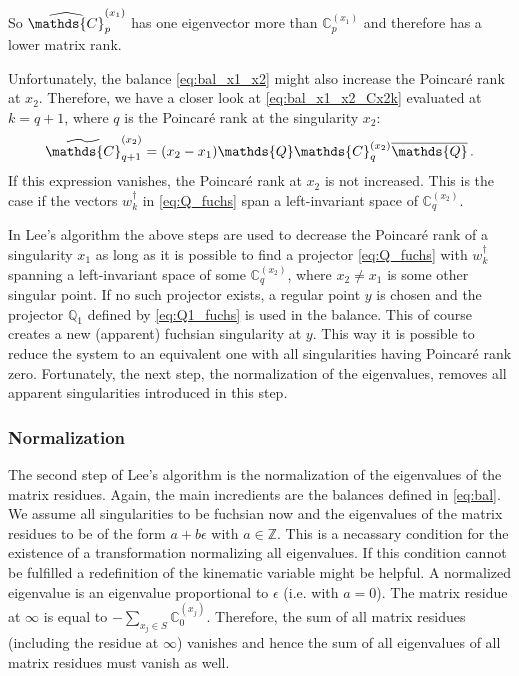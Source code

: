 \documentclass[12pt]{article}
\numberwithin{equation}{section}
\numberwithin{figure}{section}
\newcommand{\C}{\mathds{C}}
\newcommand{\Q}{\mathds{Q}}
\newcommand{\Qbar}{\overline\Q}
\begin{document}
        So $\widehat \C^{(x_1)}_p$ has one eigenvector more than $\C^{(x_1)}_p$ and therefore has a lower matrix rank.
        
        Unfortunately, the balance \eqref{eq:bal_x1_x2} might also increase the Poincar\'{e} rank at $x_2$.
				Therefore, we have a closer look at \eqref{eq:bal_x1_x2_Cx2k} evaluated at $k=q+1$, where $q$ is the Poincar\'{e} rank at the singularity $x_2$:
        \[
          \widetilde \C^{(x_2)}_{q+1} 
          =
          (x_2-x_1)
          \Q \C^{(x_2)}_q \Qbar\,.
        \]
        If this expression vanishes, the Poincar\'{e} rank at $x_2$ is not increased.
        This is the case if the vectors $w_k^\dagger$ in \eqref{eq:Q_fuchs} span a left-invariant space of $\C^{(x_2)}_q$.
        
				In Lee's algorithm the above steps are used to decrease the Poincar\'{e} rank of a singularity $x_1$ as long as it is possible to find a projector \eqref{eq:Q_fuchs} with $w_k^\dagger$ spanning a left-invariant space of some $\C^{(x_2)}_q$, where $x_2 \neq x_1$ is some other singular point.
        If no such projector exists, a regular point $y$ is chosen and the projector $\Q_1$ defined by \eqref{eq:Q1_fuchs} is used in the balance.
        This of course creates a new (apparent) fuchsian singularity at $y$.
        This way it is possible to reduce the system to an equivalent one with all singularities having Poincar\'{e} rank zero.
        Fortunately, the next step, the normalization of the eigenvalues, removes all apparent singularities introduced in this step.
      \subsubsection*{Normalization}
				The second step of Lee's algorithm is the normalization of the eigenvalues of the matrix residues.
				Again, the main incredients are the balances defined in \eqref{eq:bal}.
        We assume all singularities to be fuchsian now and the eigenvalues of the matrix residues to be of the form $a+b\epsilon$ with $a\in\mathds{Z}$.
				This is a necassary condition for the existence of a transformation normalizing all eigenvalues.
				If this condition cannot be fulfilled a redefinition of the kinematic variable might be helpful.
        A normalized eigenvalue is an eigenvalue proportional to $\epsilon$ (i.e. with $a=0$).
        The matrix residue at $\infty$ is equal to $-\sum_{x_j\in S} \C^{(x_j)}_0$.
        Therefore, the sum of all matrix residues (including the residue at $\infty$) vanishes and hence the sum of all eigenvalues of all matrix residues must vanish as well.
\end{document}
